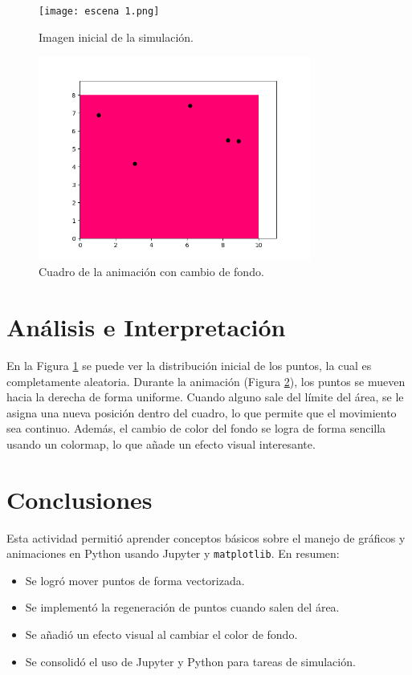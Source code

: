 \documentclass[a4paper,10pt]{article}
\begin{document}
\begin{figure}[H]
    \centering
    \texttt{[image: escena 1.png]}
    \caption{Imagen inicial de la simulación.}
    \label{fig:inicial}
\end{figure}

\begin{figure}[H]
    \centering
    \includegraphics[width=0.8\textwidth]{escena2.png}
    \caption{Cuadro de la animación con cambio de fondo.}
    \label{fig:animacion}
\end{figure}

\section{Análisis e Interpretación}
En la Figura \ref{fig:inicial} se puede ver la distribución inicial de los puntos, la cual es completamente aleatoria. Durante la animación (Figura \ref{fig:animacion}), los puntos se mueven hacia la derecha de forma uniforme. Cuando alguno sale del límite del área, se le asigna una nueva posición dentro del cuadro, lo que permite que el movimiento sea continuo. Además, el cambio de color del fondo se logra de forma sencilla usando un colormap, lo que añade un efecto visual interesante.

\section{Conclusiones}
Esta actividad permitió aprender conceptos básicos sobre el manejo de gráficos y animaciones en Python usando Jupyter y \texttt{matplotlib}. En resumen:
\begin{itemize}
    \item Se logró mover puntos de forma vectorizada.
    \item Se implementó la regeneración de puntos cuando salen del área.
    \item Se añadió un efecto visual al cambiar el color de fondo.
    \item Se consolidó el uso de Jupyter y Python para tareas de simulación.
\end{itemize}
\end{document}
